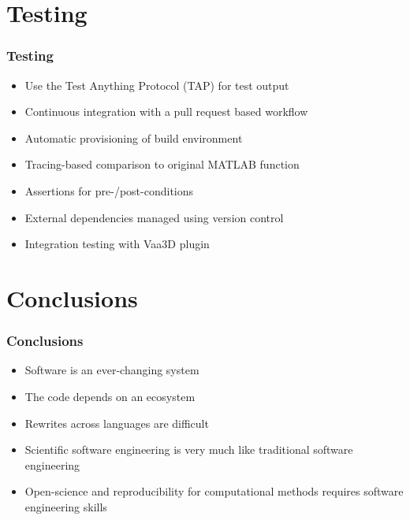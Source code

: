 \documentclass[%
        hyperref={%
                pdfauthor={Zakariyya Mughal},%
                pdfpagemode={None},pdfpagelayout={SinglePage}}%
        xcolor={x11names},%
]{beamer}
\begin{document}
\section{Testing}
\begin{frame}
\frametitle{Testing}
\begin{itemize}
	\item Use the Test Anything Protocol (TAP) for test output
	\item Continuous integration with a pull request based workflow
	\item Automatic provisioning of build environment
	\item Tracing-based comparison to original MATLAB function
	\item Assertions for pre-/post-conditions
	\item External dependencies managed using version control
	\item Integration testing with Vaa3D plugin
\end{itemize}
\end{frame}

\section{Conclusions}
\begin{frame}
\frametitle{Conclusions}
\begin{itemize}
	\item Software is an ever-changing system
	\item The code depends on an ecosystem
	\item Rewrites across languages are difficult
	\item Scientific software engineering is very much like traditional software engineering
	\item Open-science and reproducibility for computational methods requires software engineering skills
\end{itemize}
\end{frame}
\end{document}
